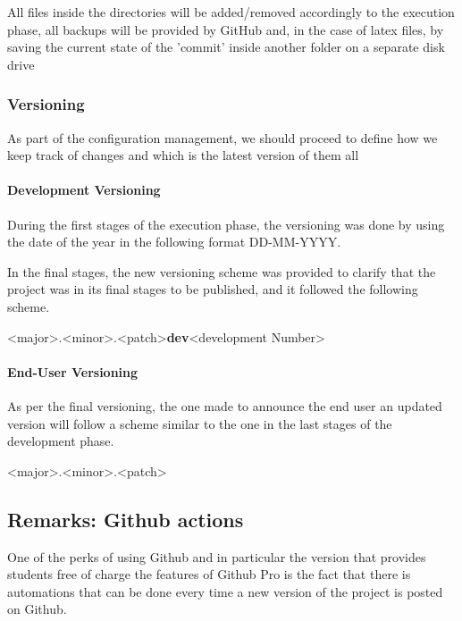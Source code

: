 All files inside the directories will be added/removed accordingly to the execution phase, all backups will be provided by GitHub and, in the case of latex files, by saving the current state of the 'commit' inside another folder on a separate disk drive
\subsubsection{Versioning}
As part of the configuration management, we should proceed to define how we keep track of changes and which is the latest version of them all
\paragraph{Development Versioning}
During the first stages of the execution phase, the versioning was done by using the date of the year in the following format DD-MM-YYYY.

In the final stages, the new versioning scheme was provided to clarify that the project was in its final stages to be published, and it followed the following scheme.
\begin{center}
    <major>.<minor>.<patch>\textbf{dev}<development Number>
\end{center}
\paragraph{End-User Versioning}
As per the final versioning, the one made to announce the end user an updated version will follow a scheme similar to the one in the last stages of the development phase.
\begin{center}
    <major>.<minor>.<patch>
\end{center}

\subsection{Remarks: Github actions}
One of the perks of using Github and in particular the version that provides students free of charge the features of Github Pro is the fact that there is automations that can be done every time a new version of the project is posted on Github.

